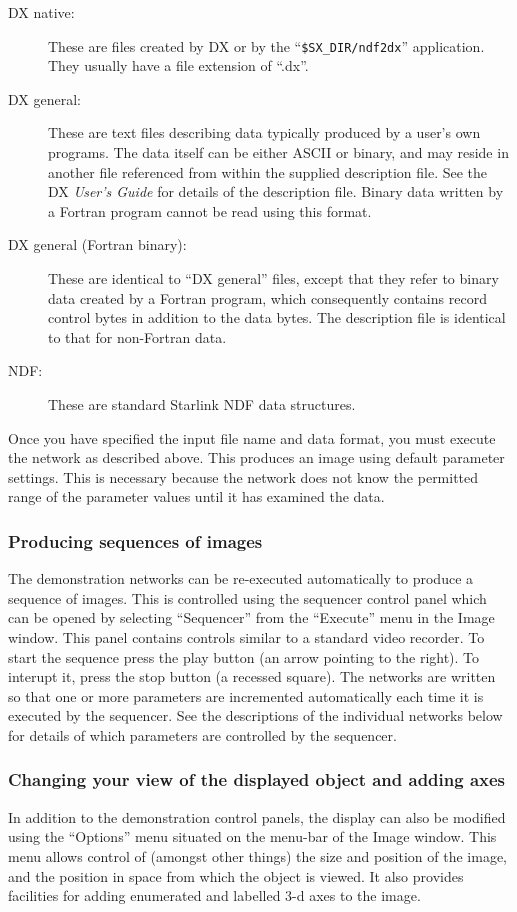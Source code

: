 \begin{description}
\item [DX native:] These are files created by DX or by the
``{\tt \$SX\_DIR/ndf2dx}'' application. They usually have a file extension of ``.dx''.
\item[DX general:] These are text files describing data typically produced by
a user's own programs. The data itself can be either ASCII or binary,
and may reside in another file
referenced from within the supplied description file. See the DX {\em User's Guide}
for details of the description file. Binary data written by a Fortran
program cannot be read using this format.
\item[DX general (Fortran binary):] These are identical to ``DX general'' files,
except that they refer to binary data created by a Fortran program, which
consequently contains record control bytes in addition to the data bytes. The
description file is identical to that for non-Fortran data.
\item[NDF:] These are standard Starlink NDF data structures.
\end{description}

Once you have specified the input file name and data format, you must
execute the network as described above. This produces an image using
default parameter settings. This is necessary because the network does
not know the permitted range of the parameter values until it has
examined the data.

\subsubsection{Producing sequences of images}
The demonstration networks can be re-executed automatically to produce a
sequence of images. This is controlled using the sequencer control panel
which can be opened by selecting ``Sequencer'' from the ``Execute'' menu in
the Image window. This panel contains controls similar to a standard
video recorder. To start the sequence press the play button (an
arrow pointing to the right). To interupt it, press the stop button (a
recessed square). The networks are written so that one or
more parameters are incremented automatically each time it is executed by the
sequencer. See the descriptions of the individual networks below for
details of which parameters are controlled by the sequencer.

\subsubsection{Changing your view of the displayed object and adding axes}
In addition to the demonstration control panels, the display can also be
modified using the ``Options'' menu situated on the menu-bar of
the Image window.  This menu allows control of (amongst other things) the
size and position of the image, and the position in space from which the
object is viewed. It also provides facilities for adding enumerated and
labelled 3-d axes to the image.

